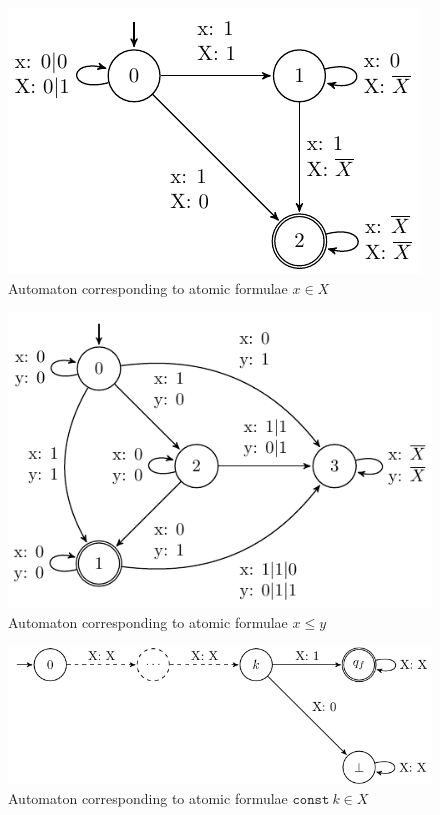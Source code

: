 \begin{figure}[h!]
 \begin{center}
  \includegraphics{fig/atomic-x-in-X}
 \end{center}
 \caption{Automaton corresponding to atomic formulae $x \in X$}
\end{figure}

\begin{figure}[h!]
 \begin{center}
  \includegraphics{fig/atomic-x-lesseq-y}
 \end{center}
 \caption{Automaton corresponding to atomic formulae $x \leq y$}
\end{figure}

\begin{figure}[h!]
 \begin{center}
  \includegraphics{fig/atomic-konst-in-X}
 \end{center}
 \caption{Automaton corresponding to atomic formulae $\mathtt{const}\ k \in X$}
\end{figure}

